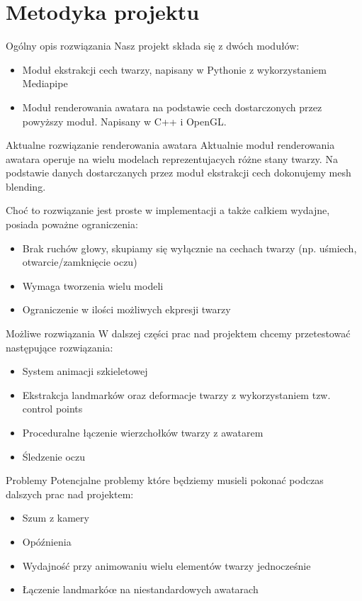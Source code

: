 \documentclass{beamer}
\begin{document}
\section{Metodyka projektu}
  \begin{frame}{Ogólny opis rozwiązania}
    Nasz projekt składa się z dwóch modułów:
    \begin{itemize}
      \item Moduł ekstrakcji cech twarzy, napisany w Pythonie z wykorzystaniem Mediapipe
      \item Moduł renderowania awatara na podstawie cech dostarczonych przez powyższy moduł. Napisany w C++ i OpenGL.
    \end{itemize}
  \end{frame}
  \begin{frame}{Aktualne rozwiązanie renderowania awatara}
    Aktualnie moduł renderowania awatara operuje na wielu modelach reprezentujacych różne stany twarzy.
    Na podstawie danych dostarczanych przez moduł ekstrakcji cech dokonujemy mesh blending.
    
    Choć to rozwiązanie jest proste w implementacji a także całkiem wydajne, posiada poważne ograniczenia:
    \begin{itemize}
      \item Brak ruchów głowy, skupiamy się wyłącznie na cechach twarzy (np. uśmiech, otwarcie/zamknięcie oczu)
      \item Wymaga tworzenia wielu modeli
      \item Ograniczenie w ilości możliwych ekpresji twarzy
    \end{itemize}
  \end{frame}
  \begin{frame}{Możliwe rozwiązania}
    W dalszej części prac nad projektem chcemy przetestować następujące rozwiązania:
    \begin{itemize}
      \item System animacji szkieletowej
      \item Ekstrakcja landmarków oraz deformacje twarzy z wykorzystaniem tzw. control points
      \item Proceduralne łączenie wierzchołków twarzy z awatarem
      \item Śledzenie oczu
    \end{itemize}
  \end{frame}
  \begin{frame}{Problemy}
    Potencjalne problemy które będziemy musieli pokonać podczas dalszych prac nad projektem:
    \begin{itemize}
      \item Szum z kamery
      \item Opóźnienia
      \item Wydajność przy animowaniu wielu elementów twarzy jednocześnie
      \item Łączenie landmarkóœ na niestandardowych awatarach
    \end{itemize}
  \end{frame}
\end{document}
